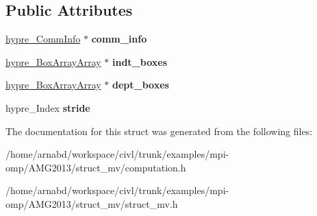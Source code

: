 \subsection*{Public Attributes}
\begin{DoxyCompactItemize}
\item 
\hypertarget{structhypre__ComputeInfo__struct_a1e30dd4cea9d0f40f2cd6cf5be6d1b10}{}\hyperlink{structhypre__CommInfo__struct}{hypre\+\_\+\+Comm\+Info} $\ast$ {\bfseries comm\+\_\+info}\label{structhypre__ComputeInfo__struct_a1e30dd4cea9d0f40f2cd6cf5be6d1b10}

\item 
\hypertarget{structhypre__ComputeInfo__struct_a02123b571c50865cf9b5dec2d23a8d06}{}\hyperlink{structhypre__BoxArrayArray__struct}{hypre\+\_\+\+Box\+Array\+Array} $\ast$ {\bfseries indt\+\_\+boxes}\label{structhypre__ComputeInfo__struct_a02123b571c50865cf9b5dec2d23a8d06}

\item 
\hypertarget{structhypre__ComputeInfo__struct_aa5366d02a61b70e594e8ed1ffbfb166c}{}\hyperlink{structhypre__BoxArrayArray__struct}{hypre\+\_\+\+Box\+Array\+Array} $\ast$ {\bfseries dept\+\_\+boxes}\label{structhypre__ComputeInfo__struct_aa5366d02a61b70e594e8ed1ffbfb166c}

\item 
\hypertarget{structhypre__ComputeInfo__struct_a15665f5ea599ba1792e7843e846a8506}{}hypre\+\_\+\+Index {\bfseries stride}\label{structhypre__ComputeInfo__struct_a15665f5ea599ba1792e7843e846a8506}

\end{DoxyCompactItemize}


The documentation for this struct was generated from the following files\+:\begin{DoxyCompactItemize}
\item 
/home/arnabd/workspace/civl/trunk/examples/mpi-\/omp/\+A\+M\+G2013/struct\+\_\+mv/computation.\+h\item 
/home/arnabd/workspace/civl/trunk/examples/mpi-\/omp/\+A\+M\+G2013/struct\+\_\+mv/struct\+\_\+mv.\+h\end{DoxyCompactItemize}
